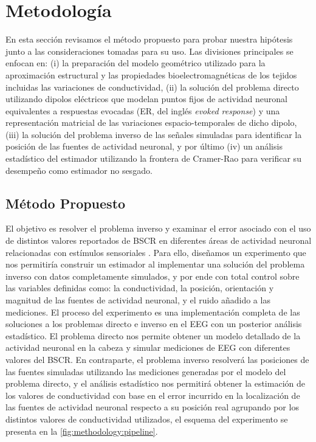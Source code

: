 %
\chapter{Metodología}
\label{sec:methodology}

En esta sección revisamos el método propuesto para probar nuestra hipótesis junto a las consideraciones tomadas para su uso.
Las divisiones principales se enfocan en:\linebreak
(i) la preparación del modelo geométrico utilizado para la aproximación estructural y las propiedades bioelectromagnéticas de los tejidos incluidas las variaciones de conductividad, (ii) la solución del problema directo utilizando dipolos eléctricos que modelan puntos fijos de actividad neuronal equivalentes a respuestas evocadas (ER, del inglés \emph{evoked response}) y una representación matricial de las variaciones espacio-temporales de dicho dipolo, (iii) la solución del problema inverso de las señales simuladas para identificar la posición de las fuentes de actividad neuronal, y por último (iv) un análisis estadístico del estimador utilizando la frontera de Cramer-Rao para verificar su desempeño como estimador no sesgado.

\section{Método Propuesto}
\label{sec:methodology:method}

El objetivo es resolver el problema inverso y examinar el error asociado con el uso de distintos valores reportados de BSCR en diferentes áreas de actividad neuronal relacionadas con estímulos sensoriales \cite{McCann2019}.
Para ello, diseñamos un experimento que nos permitiría construir un estimador al implementar una solución del problema inverso con datos completamente simulados, y por ende con total control sobre las variables definidas como: la conductividad, la posición, orientación y magnitud de las fuentes de actividad neuronal, y el ruido añadido a las mediciones.
El proceso del experimento es una implementación completa de las soluciones a los problemas directo e inverso en el EEG con un posterior análisis estadístico. 
El problema directo nos permite obtener un modelo detallado de la actividad neuronal en la cabeza y simular mediciones de EEG con diferentes valores del BSCR.
En contraparte, el problema inverso resolverá las posiciones de las fuentes simuladas utilizando las mediciones generadas por el modelo del problema directo, y el análisis estadístico nos permitirá obtener la estimación de los valores de conductividad con base en el error incurrido en la localización de las fuentes de actividad neuronal respecto a su posición real agrupando por los distintos valores de conductividad utilizados, el esquema del experimento se presenta en la \cref{fig:methodology:pipeline}.


